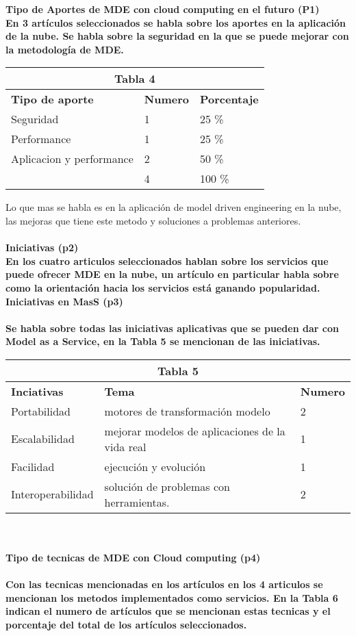 \documentclass{llncs}
\begin{document}
\bf Tipo de Aportes de MDE con cloud computing en el futuro (P1)\\
En 3 artículos seleccionados se habla sobre los aportes en la aplicación de la nube. Se habla sobre la seguridad en la que se puede mejorar con la metodología de MDE.

\begin{tabular}{  | p{5cm} | p{3cm} | p{2cm} |}
  \hline
  \multicolumn{3}{|c|}{\bf Tabla 4} \\
  \hline
  \bf Tipo de aporte  & \bf Numero & \bf Porcentaje \\
  \hline
  Seguridad & 1  & 25 \% \\
  \hline
   Performance & 1 & 25 \% \\
   \hline
   Aplicacion y performance & 2 & 50 \% \\
   \hline
                                         &  4 & 100 \%  \\
    \hline
\end{tabular}


Lo que mas se habla es en la aplicación de model driven engineering en la nube, las mejoras que tiene este metodo y soluciones a problemas anteriores. \\ \\
\bf Iniciativas (p2) \\
En los cuatro articulos seleccionados hablan sobre los servicios que puede ofrecer MDE en la nube, un artículo en particular habla sobre como  la orientación hacia los servicios está ganando popularidad.
\\
\bf Iniciativas en MasS (p3) \\ \\
Se habla sobre todas las iniciativas aplicativas que se pueden dar con Model as a Service, en la Tabla 5 se mencionan de las iniciativas.
\begin{tabular}{  | p{4cm} | p{5cm}   | p{2cm} | }
  \hline
  \multicolumn{3}{|c|}{\bf Tabla 5} \\
  \hline
  \bf Inciativas  & \bf Tema& \bf Numero  \\
  \hline
   Portabilidad & motores de transformación modelo & 2 \\
  \hline
   Escalabilidad & mejorar modelos de aplicaciones de la vida real & 1 \\
  \hline
   Facilidad & ejecución y evolución & 1\\
  \hline
   Interoperabilidad & solución de problemas con herramientas. &  2 \\
  \hline
\end{tabular} \\ \\
\bf Tipo de tecnicas de MDE con Cloud computing (p4)\\ \\
Con las tecnicas mencionadas en los artículos en los 4 articulos se mencionan los metodos implementados como servicios. En la Tabla 6 indican el numero de artículos que se mencionan estas tecnicas y el porcentaje del total de los artículos seleccionados.
\end{document}
